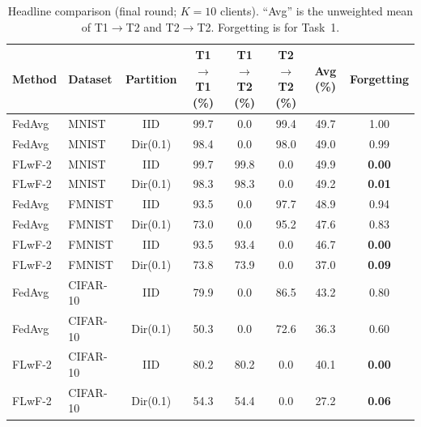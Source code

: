 \begin{table}[t]
\centering
\caption{Headline comparison (final round; $K{=}10$ clients).
``Avg'' is the unweighted mean of T1$\to$T2 and T2$\to$T2.
Forgetting is for Task~1.}
\label{tab:headline}
\renewcommand{\arraystretch}{1.15}
\begin{tabular}{llcccccc}
\toprule
\textbf{Method} & \textbf{Dataset} & \textbf{Partition}
 & \textbf{T1$\to$T1 (\%)} & \textbf{T1$\to$T2 (\%)}
 & \textbf{T2$\to$T2 (\%)} & \textbf{Avg (\%)}
 & \textbf{Forgetting} \\
\midrule
FedAvg & MNIST    & IID       &  99.7 &   0.0 &  99.4 &  49.7 & 1.00 \\
FedAvg & MNIST    & Dir(0.1)  &  98.4 &   0.0 &  98.0 &  49.0 & 0.99 \\
FLwF-2 & MNIST    & IID       &  99.7 &  99.8 &   0.0 &  49.9 & \textbf{0.00} \\
FLwF-2 & MNIST    & Dir(0.1)  &  98.3 &  98.3 &   0.0 &  49.2 & \textbf{0.01} \\
\midrule
FedAvg & FMNIST   & IID       &  93.5 &   0.0 &  97.7 &  48.9 & 0.94 \\
FedAvg & FMNIST   & Dir(0.1)  &  73.0 &   0.0 &  95.2 &  47.6 & 0.83 \\
FLwF-2 & FMNIST   & IID       &  93.5 &  93.4 &   0.0 &  46.7 & \textbf{0.00} \\
FLwF-2 & FMNIST   & Dir(0.1)  &  73.8 &  73.9 &   0.0 &  37.0 & \textbf{0.09} \\
\midrule
FedAvg & CIFAR-10 & IID       &  79.9 &   0.0 &  86.5 &  43.2 & 0.80 \\
FedAvg & CIFAR-10 & Dir(0.1)  &  50.3 &   0.0 &  72.6 &  36.3 & 0.60 \\
FLwF-2 & CIFAR-10 & IID       &  80.2 &  80.2 &   0.0 &  40.1 & \textbf{0.00} \\
FLwF-2 & CIFAR-10 & Dir(0.1)  &  54.3 &  54.4 &   0.0 &  27.2 & \textbf{0.06} \\
\bottomrule
\end{tabular}
\end{table}
